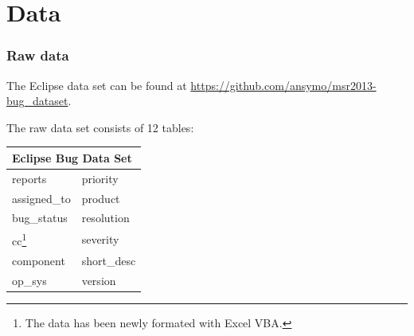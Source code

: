 \documentclass[xcolor=sgvnames,serifs,notes,compress,professionalfont]{beamer}
\begin{document}
\section{Data}
\begin{frame}
\frametitle{Raw data}
The Eclipse data set can be found at
\url{https://github.com/ansymo/msr2013-bug_dataset}.

The raw data set consists of 12 tables:
\begin{table}
	\centering
	\begin{tabular}{|l|l|}
		\hline
		\multicolumn{2}{|l|}{Eclipse Bug Data Set}\\
		\hline
		reports & priority\\
		assigned\_to & product\\
		bug\_status & resolution\\
		cc\footnote{The data has been newly formated with Excel VBA.} & severity\\
		component & short\_desc\\
		op\_sys & version\\
		\hline 
	\end{tabular}
\end{table}	

\end{frame}
\end{document}
